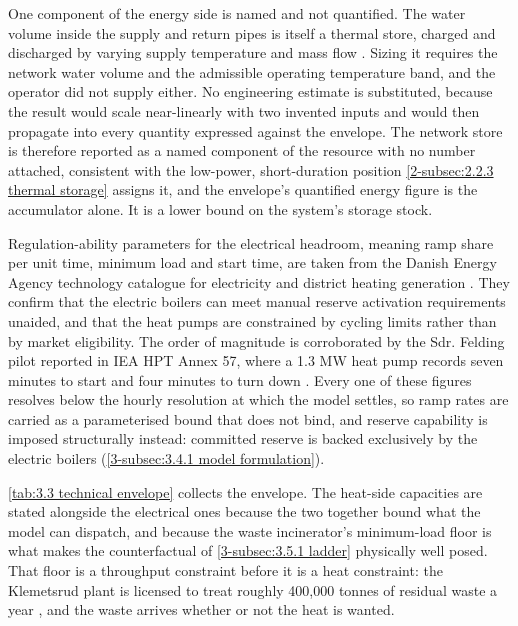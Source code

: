 One component of the energy side is named and not quantified. The water volume inside the supply and return pipes is itself a thermal store, charged and discharged by varying supply temperature and mass flow \cite{mitridati_power_2018}. Sizing it requires the network water volume and the admissible operating temperature band, and the operator did not supply either. No engineering estimate is substituted, because the result would scale near-linearly with two invented inputs and would then propagate into every quantity expressed against the envelope. The network store is therefore reported as a named component of the resource with no number attached, consistent with the low-power, short-duration position \autoref{2-subsec:2.2.3 thermal storage} assigns it, and the envelope's quantified energy figure is the accumulator alone. It is a lower bound on the system's storage stock.

Regulation-ability parameters for the electrical headroom, meaning ramp share per unit time, minimum load and start time, are taken from the Danish Energy Agency technology catalogue for electricity and district heating generation \cite{danish_energy_agency_technology_2024}. They confirm that the electric boilers can meet manual reserve activation requirements unaided, and that the heat pumps are constrained by cycling limits rather than by market eligibility. The order of magnitude is corroborated by the Sdr. Felding pilot reported in IEA HPT Annex 57, where a 1.3 MW heat pump records seven minutes to start and four minutes to turn down \cite{v_pedersen_annex_2024}. Every one of these figures resolves below the hourly resolution at which the model settles, so ramp rates are carried as a parameterised bound that does not bind, and reserve capability is imposed structurally instead: committed reserve is backed exclusively by the electric boilers (\autoref{3-subsec:3.4.1 model formulation}).

\autoref{tab:3.3 technical envelope} collects the envelope. The heat-side capacities are stated alongside the electrical ones because the two together bound what the model can dispatch, and because the waste incinerator's minimum-load floor is what makes the counterfactual of \autoref{3-subsec:3.5.1 ladder} physically well posed. That floor is a throughput constraint before it is a heat constraint: the Klemetsrud plant is licensed to treat roughly 400{,}000 tonnes of residual waste a year \cite{dsbno_bygging_2026}, and the waste arrives whether or not the heat is wanted.

